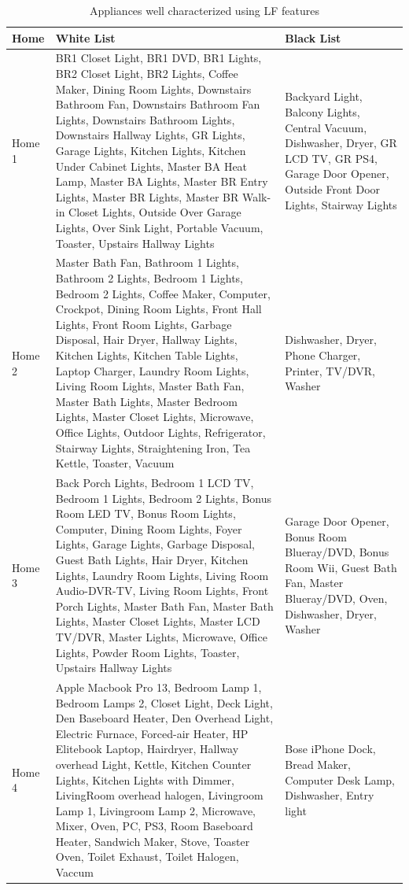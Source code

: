 \documentclass[11pt, letterpaper]{article}
\begin{document}
\begin{table}[H]
\caption{Appliances well characterized using LF features}
\begin{center}
\begin{tabular}{|p{2cm}|p{9.5cm}|p{3.8cm}|}\hline
\textbf{Home} & \textbf{White List} & \textbf{Black List}\\
\hline
Home 1 & 
BR1 Closet Light, BR1 DVD, BR1 Lights, BR2 Closet Light, BR2 Lights, Coffee Maker, Dining Room Lights, Downstairs Bathroom Fan, Downstairs Bathroom Fan Lights, Downstairs Bathroom Lights, Downstairs Hallway Lights, GR Lights, Garage Lights, Kitchen Lights, Kitchen Under Cabinet Lights, Master BA Heat Lamp, Master BA Lights, Master BR Entry Lights, Master BR Lights, Master BR Walk-in Closet Lights, Outside Over Garage Lights, Over Sink Light, Portable Vacuum, Toaster, Upstairs Hallway Lights
 &
Backyard Light, Balcony Lights, Central Vacuum, Dishwasher, Dryer, GR LCD TV, GR PS4, Garage Door Opener, Outside Front Door Lights, Stairway Lights
\\
\hline
Home 2 & 
Master Bath Fan, Bathroom 1 Lights, Bathroom 2 Lights, Bedroom 1 Lights, Bedroom 2 Lights, Coffee Maker, Computer, Crockpot, Dining Room Lights, Front Hall Lights, Front Room Lights, Garbage Disposal, Hair Dryer, Hallway Lights, Kitchen Lights, Kitchen Table Lights, Laptop Charger, Laundry Room Lights, Living Room Lights, Master Bath Fan, Master Bath Lights, Master Bedroom Lights, Master Closet Lights, Microwave, Office Lights, Outdoor Lights, Refrigerator, Stairway Lights, Straightening Iron, Tea Kettle, Toaster, Vacuum
&  
Dishwasher, Dryer, Phone Charger, Printer, TV/DVR, Washer\\
\hline
Home 3 &  
Back Porch Lights, Bedroom 1 LCD TV, Bedroom 1 Lights, Bedroom 2 Lights, Bonus Room LED TV, Bonus Room Lights, Computer, Dining Room Lights, Foyer Lights, Garage Lights, Garbage Disposal, Guest Bath Lights, Hair Dryer, Kitchen Lights, Laundry Room Lights, Living Room Audio-DVR-TV, Living Room Lights, Front Porch Lights, Master Bath Fan, Master Bath Lights, Master Closet Lights, Master LCD TV/DVR, Master Lights, Microwave, Office Lights, Powder Room Lights, Toaster, Upstairs Hallway Lights
&
Garage Door Opener, Bonus Room Blueray/DVD, Bonus Room Wii, Guest Bath Fan, Master Blueray/DVD, Oven, Dishwasher, Dryer, Washer
\\
\hline
Home 4 &  
Apple Macbook Pro 13, Bedroom Lamp 1, Bedroom Lamps 2, Closet Light, Deck Light, Den Baseboard Heater, Den Overhead Light, Electric Furnace, Forced-air Heater, HP Elitebook Laptop, Hairdryer, Hallway overhead Light, Kettle, Kitchen Counter Lights, Kitchen Lights with Dimmer, LivingRoom overhead halogen, Livingroom Lamp 1, Livingroom Lamp 2, Microwave, Mixer, Oven, PC, PS3, Room Baseboard Heater, Sandwich Maker, Stove, Toaster Oven, Toilet Exhaust, Toilet Halogen, Vaccum
& 
Bose iPhone Dock, Bread Maker, Computer Desk Lamp, Dishwasher, Entry light
\\
\hline
\end{tabular}
\end{center}
\label{tab:LFList}
\end{table}
\end{document}
